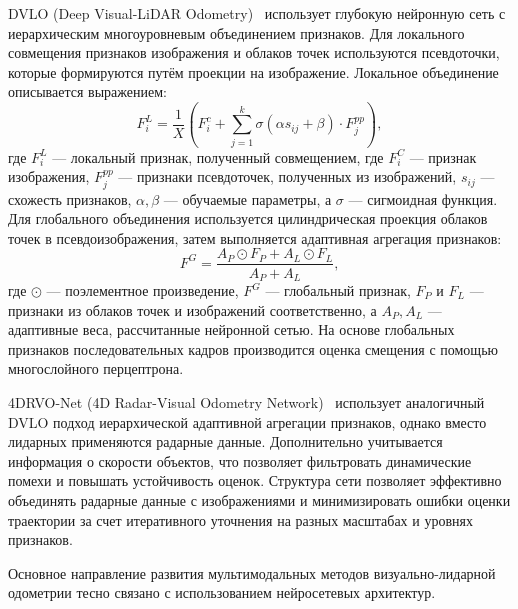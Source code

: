 DVLO (Deep Visual-LiDAR Odometry)~\cite{liu2024dvlo} использует глубокую нейронную сеть с 
иерархическим многоуровневым объединением признаков. Для локального совмещения 
признаков изображения и облаков точек используются псевдоточки, которые 
формируются путём проекции на изображение. Локальное объединение описывается 
выражением:
\begin{equation}
F_i^L = \frac{1}{X}\left(F_i^c + \sum_{j=1}^{k} \sigma(\alpha s_{ij} + \beta) \cdot F_j^{pp}\right),
\end{equation}
где $F_i^L$ --- локальный признак, полученный совмещением, где $F_i^C$ --- признак изображения, 
$F_j^{pp}$ --- признаки псевдоточек, полученных из изображений, $s_{ij}$ --- 
схожесть признаков, $\alpha, \beta$ --- обучаемые параметры, а $\sigma$ --- сигмоидная функция.
Для глобального объединения используется цилиндрическая проекция облаков точек 
в псевдоизображения, затем выполняется адаптивная агрегация признаков:
\begin{equation}
F^G = \frac{A_P \odot F_P + A_L \odot F_L}{A_P + A_L},
\end{equation}
где $\odot$ --- поэлементное произведение, $F^G$ --- глобальный признак, $F_P$ и $F_L$ --- признаки из облаков точек и изображений 
соответственно, а $A_P, A_L$ --- адаптивные веса, рассчитанные нейронной сетью.
На основе глобальных признаков последовательных кадров производится оценка смещения
с помощью многослойного перцептрона. 

4DRVO-Net (4D Radar-Visual Odometry Network)~\cite{zhuo20234drvo} использует аналогичный DVLO подход 
иерархической адаптивной агрегации признаков, однако вместо лидарных применяются 
радарные данные. Дополнительно учитывается информация о скорости объектов, что 
позволяет фильтровать динамические помехи и повышать устойчивость оценок. 
Структура сети позволяет эффективно объединять радарные данные с изображениями 
и минимизировать ошибки оценки траектории за счет итеративного уточнения на разных 
масштабах и уровнях признаков.

Основное направление развития мультимодальных методов визуально-лидарной одометрии
тесно связано с использованием нейросетевых архитектур.


